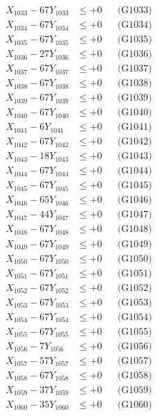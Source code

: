 \documentclass[a4paper,10pt]{article}
\begin{document}
{\begin{align}
X_{1033} - 67Y_{1033} &\leq +0 && \text{(G1033)} \\
X_{1034} - 67Y_{1034} &\leq +0 && \text{(G1034)} \\
X_{1035} - 67Y_{1035} &\leq +0 && \text{(G1035)} \\
X_{1036} - 27Y_{1036} &\leq +0 && \text{(G1036)} \\
X_{1037} - 67Y_{1037} &\leq +0 && \text{(G1037)} \\
X_{1038} - 67Y_{1038} &\leq +0 && \text{(G1038)} \\
X_{1039} - 67Y_{1039} &\leq +0 && \text{(G1039)} \\
X_{1040} - 67Y_{1040} &\leq +0 && \text{(G1040)} \\
\allowbreak
X_{1041} - 6Y_{1041} &\leq +0 && \text{(G1041)} \\
X_{1042} - 67Y_{1042} &\leq +0 && \text{(G1042)} \\
X_{1043} - 18Y_{1043} &\leq +0 && \text{(G1043)} \\
X_{1044} - 67Y_{1044} &\leq +0 && \text{(G1044)} \\
X_{1045} - 67Y_{1045} &\leq +0 && \text{(G1045)} \\
X_{1046} - 65Y_{1046} &\leq +0 && \text{(G1046)} \\
X_{1047} - 44Y_{1047} &\leq +0 && \text{(G1047)} \\
X_{1048} - 67Y_{1048} &\leq +0 && \text{(G1048)} \\
X_{1049} - 67Y_{1049} &\leq +0 && \text{(G1049)} \\
X_{1050} - 67Y_{1050} &\leq +0 && \text{(G1050)} \\
\allowbreak
X_{1051} - 67Y_{1051} &\leq +0 && \text{(G1051)} \\
X_{1052} - 67Y_{1052} &\leq +0 && \text{(G1052)} \\
X_{1053} - 67Y_{1053} &\leq +0 && \text{(G1053)} \\
X_{1054} - 67Y_{1054} &\leq +0 && \text{(G1054)} \\
X_{1055} - 67Y_{1055} &\leq +0 && \text{(G1055)} \\
X_{1056} - 7Y_{1056} &\leq +0 && \text{(G1056)} \\
X_{1057} - 57Y_{1057} &\leq +0 && \text{(G1057)} \\
X_{1058} - 67Y_{1058} &\leq +0 && \text{(G1058)} \\
X_{1059} - 37Y_{1059} &\leq +0 && \text{(G1059)} \\
X_{1060} - 35Y_{1060} &\leq +0 && \text{(G1060)} \\
\allowbreak

\end{align}}
\end{document}
